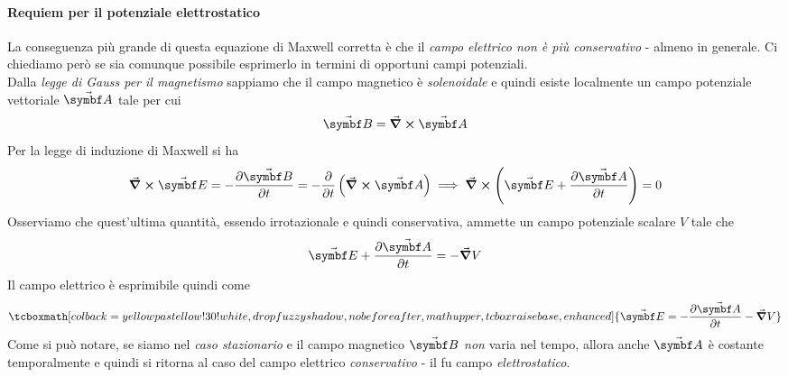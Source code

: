 \paragraph{Requiem per il potenziale elettrostatico}
La conseguenza più grande di questa equazione di Maxwell corretta è che il \textit{campo elettrico non è più conservativo} - almeno in generale. Ci chiediamo però se sia comunque possibile esprimerlo in termini di opportuni campi potenziali.\\
Dalla \textit{legge di Gauss per il magnetismo} sappiamo che il campo magnetico è \textit{solenoidale} e quindi esiste localmente un campo potenziale vettoriale $\vba{A}$ tale per cui
\begin{equation*}
	\vba{B}=\curl{\vba{A}}
\end{equation*}
Per la legge di induzione di Maxwell si ha
\begin{equation*}
	\curl{\vba{E}}=-\pdv{\vba{B}}{t}=-\pdv{t}\left(\curl{\vba{A}}\right)\implies \curl\left(\vba{E}+\pdv{\vba{A}}{t}\right)=0
\end{equation*}
Osserviamo che quest'ultima quantità, essendo irrotazionale e quindi conservativa, ammette un campo potenziale scalare $V$ tale che 
\begin{equation*}
	\vba{E}+\pdv{\vba{A}}{t}=-\grad{V}
\end{equation*}
Il campo elettrico è esprimibile quindi come
\begin{equation}
	\tcboxmath[colback=yellowpastellow!30!white,drop fuzzy shadow, nobeforeafter, math upper, tcbox raise base, enhanced]{\vba{E}=-\pdv{\vba{A}}{t}-\grad{V}}
\end{equation}
Come si può notare, se siamo nel \textit{caso stazionario} e il campo magnetico $\vba{B}$ \textit{non} varia nel tempo, allora anche $\vba{A}$ è costante temporalmente e quindi si ritorna al caso del campo elettrico \textit{conservativo} - il fu campo \textit{elettrostatico}.
